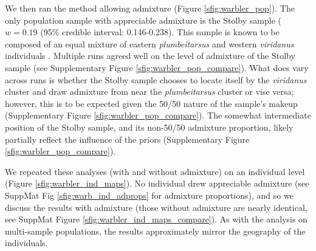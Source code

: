 \documentclass[12pt]{article}
\begin{document}
We then ran the method allowing admixture (Figure \ref{sfig:warbler_pop}). The only population sample with appreciable admixture is the Stolby sample ($w=0.19$ (95\% credible interval: 0.146-0.238).  This sample is known to be composed of an equal mixture of eastern \textit{plumbeitarsus} and western \textit{viridanus} individuals \citep{alcaide2014genomic}. Multiple runs agreed well on the level of admixture of the Stolby sample (see Supplementary Figure \ref{sfig:warbler_pop_compare}). What does vary across runs is whether the Stolby sample chooses to locate itself by the \textit{viridanus} cluster and draw admixture from near the \textit{plumbeitarsus}  cluster or vise versa; however, this is to be expected given the 50/50 nature of the sample's makeup (Supplementary Figure \ref{sfig:warbler_pop_compare}). The somewhat intermediate position of the Stolby sample, and its non-50/50 admixture proportion, likely partially reflect the influence of the priors (Supplementary Figure \ref{sfig:warbler_pop_compare}). 

We repeated these analyses (with and without admixture) on an individual level (Figure \ref{sfig:warbler_ind_maps}).  
No individual drew appreciable admixture (see SuppMat Fig \ref{sfig:warb_ind_adprops} for admixture proportions), and so we discuss the results with admixture (those without admixture are nearly identical, see SuppMat Figure \ref{sfig:warbler_ind_maps_compare}).  As with the analysis on multi-sample populations, the results approximately mirror the geography of the individuals.
\end{document}
